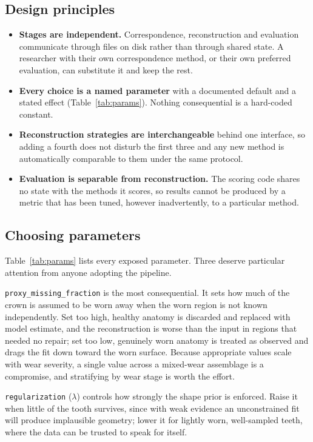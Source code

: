\documentclass[10pt,a4paper,twocolumn]{article}
\newcommand{\code}[1]{\texttt{#1}}
\begin{document}
\subsection{Design principles}

\begin{itemize}
  \item \textbf{Stages are independent.} Correspondence, reconstruction and
        evaluation communicate through files on disk rather than through shared
        state. A researcher with their own correspondence method, or their own
        preferred evaluation, can substitute it and keep the rest.
  \item \textbf{Every choice is a named parameter} with a documented default and
        a stated effect (Table~\ref{tab:params}). Nothing consequential is a
        hard-coded constant.
  \item \textbf{Reconstruction strategies are interchangeable} behind one
        interface, so adding a fourth does not disturb the first three and any
        new method is automatically comparable to them under the same protocol.
  \item \textbf{Evaluation is separable from reconstruction.} The scoring code
        shares no state with the methods it scores, so results cannot be produced
        by a metric that has been tuned, however inadvertently, to a particular
        method.
\end{itemize}

\subsection{Choosing parameters}

Table~\ref{tab:params} lists every exposed parameter. Three deserve particular
attention from anyone adopting the pipeline.

\code{proxy\_missing\_fraction} is the most consequential. It sets how much of
the crown is assumed to be worn away when the worn region is not known
independently. Set too high, healthy anatomy is discarded and replaced with model
estimate, and the reconstruction is worse than the input in regions that needed
no repair; set too low, genuinely worn anatomy is treated as observed and drags
the fit down toward the worn surface. Because appropriate values scale with wear
severity, a single value across a mixed-wear assemblage is a compromise, and
stratifying by wear stage is worth the effort.

\code{regularization} ($\lambda$) controls how strongly the shape prior is
enforced. Raise it when little of the tooth survives, since with weak evidence an
unconstrained fit will produce implausible geometry; lower it for lightly worn,
well-sampled teeth, where the data can be trusted to speak for itself.
\end{document}
